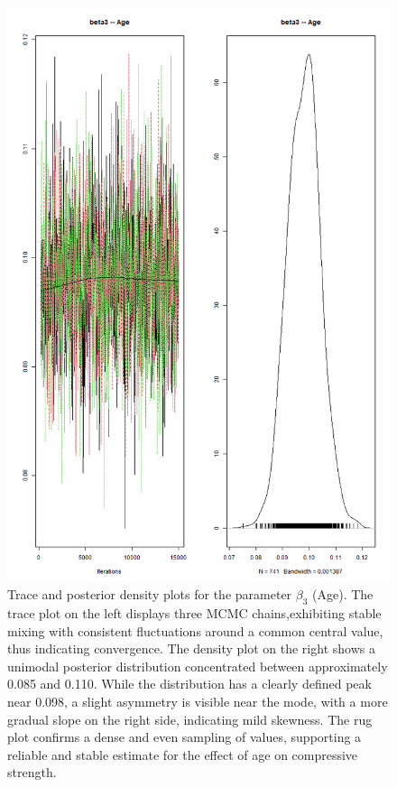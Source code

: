 \documentclass[]{article}
\begin{document}
\begin{figure}[H]
	\centering
	\includegraphics[width=0.7\linewidth]{img/img-trace-beta3}
	\caption{Trace and posterior density plots for the parameter $\beta_3$ (Age). The trace plot on the left displays three MCMC chains,exhibiting stable mixing  with consistent fluctuations around a common central value, thus indicating convergence. The density plot on the right shows a unimodal posterior distribution concentrated between approximately 0.085 and 0.110. While the distribution has a clearly defined peak near 0.098, a slight asymmetry is visible near the mode, with a more gradual slope on the right side, indicating mild skewness. The rug plot confirms a dense and even sampling of values, supporting a reliable and stable estimate for the effect of age on compressive strength.}
	\label{fig:img-trace-beta3}
\end{figure}
\end{document}
